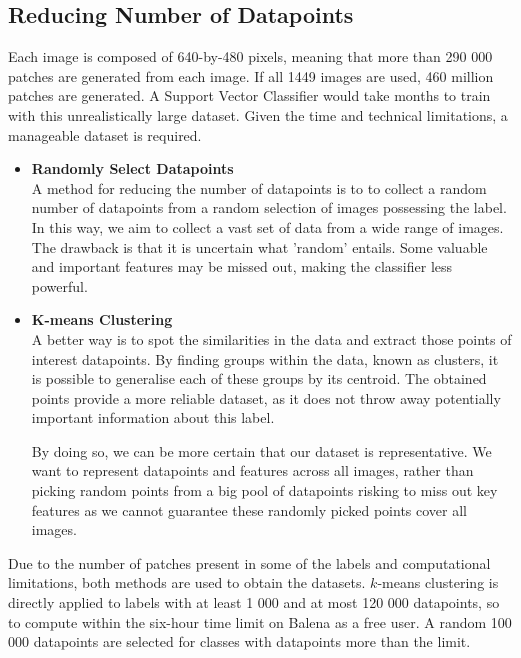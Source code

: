 \subsection{Reducing Number of Datapoints} \label{ssec:datapoint-reduction}
Each image is composed of 640-by-480 pixels, meaning that more than 290 000 patches are generated from each image. If all 1449 images are used, 460 million patches are generated. A Support Vector Classifier would take months to train with this unrealistically large dataset. Given the time and technical limitations, a manageable dataset is required. 

\begin{itemize}
  \item \textbf{Randomly Select Datapoints} \\
A method for reducing the number of datapoints is to to collect a random number of datapoints from a random selection of images possessing the label. In this way, we aim to collect a vast set of data from a wide range of images. The drawback is that it is uncertain what 'random' entails. Some valuable and important features may be missed out, making the classifier less powerful. \\
  
  \item \textbf{K-means Clustering} \\
A better way is to spot the similarities in the data and extract those points of interest datapoints. By finding groups within the data, known as clusters, it is possible to generalise each of these groups by its centroid. The obtained points provide a more reliable dataset, as it does not throw away potentially important information about this label.

By doing so, we can be more certain that our dataset is representative. We want to represent datapoints and features across all images, rather than picking random points from a big pool of datapoints risking to miss out key features as we cannot guarantee these randomly picked points cover all images.
\end{itemize}

Due to the number of patches present in some of the labels and computational limitations, both methods are used to obtain the datasets. $k$-means clustering is directly applied to labels with at least 1 000 and at most 120 000 datapoints, so to compute within the six-hour time limit on Balena as a free user. A random 100 000 datapoints are selected for classes with datapoints more than the limit. 

